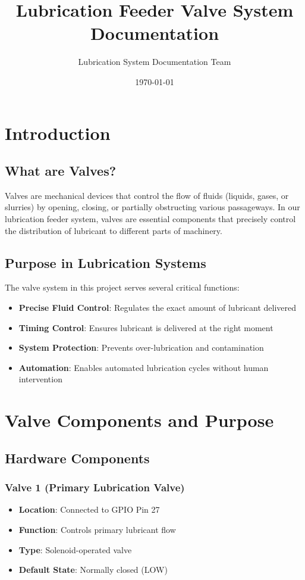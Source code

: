 \documentclass[11pt,a4paper]{article}
\title{\Huge\textbf{Lubrication Feeder Valve System}\\\Large Documentation}
\author{Lubrication System Documentation Team}
\date{\today}
\begin{document}
\maketitle
\thispagestyle{empty}

\newpage
\tableofcontents
\newpage

\section{Introduction}

\subsection{What are Valves?}
Valves are mechanical devices that control the flow of fluids (liquids, gases, or slurries) by opening, closing, or partially obstructing various passageways. In our lubrication feeder system, valves are essential components that precisely control the distribution of lubricant to different parts of machinery.

\subsection{Purpose in Lubrication Systems}
The valve system in this project serves several critical functions:
\begin{itemize}
    \item \textbf{Precise Fluid Control}: Regulates the exact amount of lubricant delivered
    \item \textbf{Timing Control}: Ensures lubricant is delivered at the right moment
    \item \textbf{System Protection}: Prevents over-lubrication and contamination
    \item \textbf{Automation}: Enables automated lubrication cycles without human intervention
\end{itemize}

\section{Valve Components and Purpose}

\subsection{Hardware Components}

\subsubsection{Valve 1 (Primary Lubrication Valve)}
\begin{itemize}
    \item \textbf{Location}: Connected to GPIO Pin 27
    \item \textbf{Function}: Controls primary lubricant flow
    \item \textbf{Type}: Solenoid-operated valve
    \item \textbf{Default State}: Normally closed (LOW)
\end{itemize}
\end{document}
